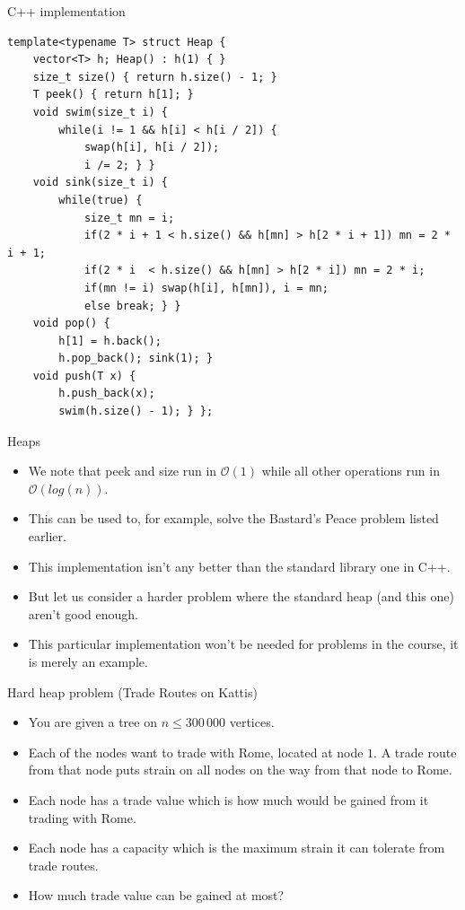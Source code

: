 \documentclass{beamer}
\begin{document}
\begin{frame}{C++ implementation}
    \scriptsize
    \begin{verbatim}
template<typename T> struct Heap {
    vector<T> h; Heap() : h(1) { }
    size_t size() { return h.size() - 1; }
    T peek() { return h[1]; }
    void swim(size_t i) {
        while(i != 1 && h[i] < h[i / 2]) {
            swap(h[i], h[i / 2]);
            i /= 2; } }
    void sink(size_t i) {
        while(true) {
            size_t mn = i;
            if(2 * i + 1 < h.size() && h[mn] > h[2 * i + 1]) mn = 2 * i + 1;
            if(2 * i  < h.size() && h[mn] > h[2 * i]) mn = 2 * i;
            if(mn != i) swap(h[i], h[mn]), i = mn;
            else break; } }
    void pop() {
        h[1] = h.back();
        h.pop_back(); sink(1); }
    void push(T x) {
        h.push_back(x);
        swim(h.size() - 1); } };
    \end{verbatim}
\end{frame}

\begin{frame}[plain]{Heaps}
    \begin{itemize}
        \item We note that peek and size run in $\mathcal{O}(1)$ while all other operations run in $\mathcal{O}(log(n))$.
        \item This can be used to, for example, solve the Bastard's Peace problem listed earlier.
        \item This implementation isn't any better than the standard library one in C++.
        \item But let us consider a harder problem where the standard heap (and this one) aren't good enough.
        \item This particular implementation won't be needed for problems in the course, it is merely an example.
    \end{itemize}
\end{frame}

\begin{frame}[plain]{Hard heap problem (Trade Routes on Kattis)}
    \begin{itemize}
        \item You are given a tree on $n \leq 300\,000$ vertices.
        \item Each of the nodes want to trade with Rome, located at node $1$. A trade route from that node puts strain on all nodes on the way from that node to Rome.
        \item Each node has a trade value which is how much would be gained from it trading with Rome.
        \item Each node has a capacity which is the maximum strain it can tolerate from trade routes.
        \item How much trade value can be gained at most?
    \end{itemize}
\end{frame}
\end{document}
